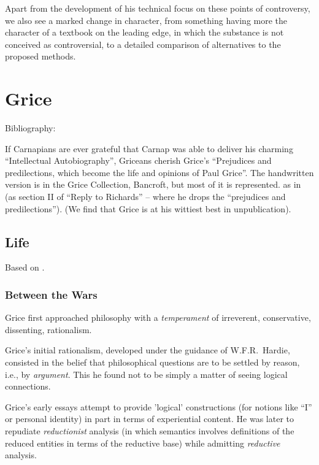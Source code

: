 \documentclass[10pt,titlepage]{book}
\begin{document}
Apart from the development of his technical focus on these points of controversy, we also see a marked change in character, from something having more the character of a textbook on the leading edge, in which the substance is not conceived as controversial, to a detailed comparison of alternatives to the proposed methods.

\chapter{Grice}

Bibliography:
\cite{grice41}
\cite{grice86}
\cite{grice86a}
\cite{grice87}
\cite{grice88}
\cite{grice89}
\cite{grice91}
\cite{grice01}
\cite{grice57}
\cite{pears57}
\cite{speranza89}
\cite{speranza91a}
\cite{speranza91b}
\cite{speranza95}

If Carnapians are ever grateful that Carnap was able to deliver his charming ``Intellectual Autobiography'', Griceans cherish Grice's ``Prejudices and predilections, which become the life and opinions of Paul Grice''\cite{grice86c}.
The handwritten version is in the Grice Collection, Bancroft, but most of it is represented. as \cite{grice86c} in \cite{grice86a} (as section II of ``Reply to Richards'' -- where he drops the ``prejudices and predilections'').
(We find that Grice is at his wittiest best in unpublication).

\section{Life}

Based on \cite{grice86c}.

\subsection{Between the Wars}

Grice first approached philosophy with a \emph{temperament} of irreverent, conservative, dissenting, rationalism.

Grice's initial rationalism, developed under the guidance of W.F.R.~Hardie, consisted in the belief that philosophical questions are to be settled by reason, i.e., by \emph{argument}.
This he found not to be simply a matter of seeing logical connections.

Grice's early essays attempt to provide 'logical' constructions (for notions like ``I'' or  personal identity) in part in terms of experiential content.
He was later to repudiate \emph{reductionist} analysis (in which semantics involves definitions of the reduced entities in terms of the reductive base) while admitting \emph{reductive} analysis. 
\end{document}

